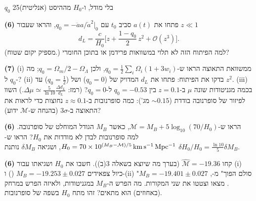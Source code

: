 \documentclass[11pt,a4paper]{article}
\begin{document}
\begin{question}{$q_0$ בלי מודל, ו-$H_0$ מההיסט (אנליטית)}{25}
\begin{parts}
\item \textbf{(6)} פתחו את $a(t)$ סביב $t_0$ עם $q_0=-\ddot a a/\dot a^2|_0$, והראו שעבור $z\ll1$
\[d_L=\frac{c}{H_0}\Big[z+\frac{1-q_0}{2}\,z^2+\mathcal O(z^3)\Big].\]
(מספיק יקום שטוח.) למה הפיתוח הזה לא תלוי במשוואות פרידמן או בתוכן החומרי?
\item \textbf{(7)} (i) ממשוואת התאוצה הראו ש-$q_0=\tfrac12\sum_i\Omega_i(1+3w_i)$, ולכן $q_0=\Omega_m/2-\Omega_\Lambda$; מה $q_0$ ל-? (ii) בדקו את הפיתוח: פתחו את $d_L$ המדויק של  ($q_0=0$) ושל  ($q_0=\tfrac12$) עד $z^2$. (iii) בכמה מגניטודות שונה $\mu$ ב-$z=0.1$ בין $q_0=-0.53$ ל-$q_0=0$? (רמז: $\Delta\mu\simeq\frac{5}{\ln10}\frac{\Delta d_L}{d_L}$.) השוו לפיזור של סופרנובה בודדת ($\sim0.15$ מג'): כמה סופרנובות ב-$z\approx0.1$ נחוצות כדי לראות את התאוצה ב-$3\sigma$ (בהנחה ש-$\mathcal M$ ידוע)?
\item \textbf{(6)} הראו ש-$\mathcal M=M_B+5\log_{10}(70/H_0)$, כאשר $M_B$ הגודל המוחלט של סופרנובה. למה סופרנובות לבדן לא מודדות את $H_0$? הראו ש-$H_0=70\times10^{(M_B-\mathcal M)/5}\,\mathrm{km\,s^{-1}\,Mpc^{-1}}$, ושגיאה $\delta M_B$ נותנת $\delta H_0/H_0=\frac{\ln10}{5}\delta M_B$.
\item \textbf{(6)} קחו $\hat{\mathcal M}=-19.36$ (בערך מה שיוצא בשאלה 3(ב)). חשבו את $H_0$ ושגיאתו עבור (i) כיול צפאידים $M_B=-19.253\pm0.027$ () ו-(ii) "סולם הפוך" מ-, $M_B=-19.401\pm0.027$. מצאו וצטטו את שני המקורות. מה הפרש ה-$M_B$ במגניטודות, ולאיזה הפרש במרחק (באחוזים) הוא מתאים? זהו מתח $H_0$ בשפה של סופרנובות.
\end{parts}
\end{question}
\end{document}
